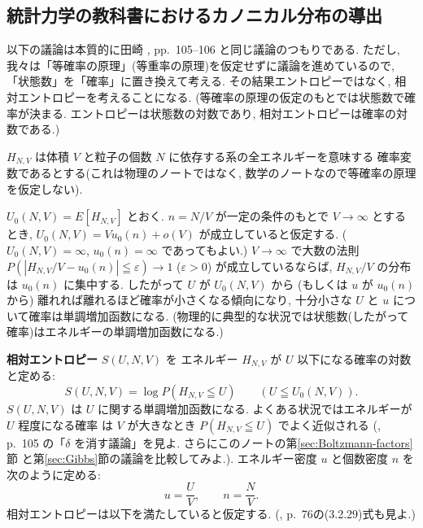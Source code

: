\documentclass[12pt,twoside]{jarticle}
\newcommand\eps{\varepsilon}
\theoremstyle{definition} %
\theoremstyle{definition} %
\theoremstyle{definition} %
\numberwithin{theorem}{section}
\numberwithin{equation}{section}
\numberwithin{figure}{section}
\numberwithin{table}{section}
\newcommand\secref[1]{第\ref{#1}節}
\begin{document}
\subsection{統計力学の教科書におけるカノニカル分布の導出}
\label{sec:canonical-distribution-in-physics}

以下の議論は本質的に田崎 \cite{Tasaki}, pp.~105--106 と同じ議論のつもりである.
ただし, 我々は「等確率の原理」(等重率の原理)を仮定せずに議論を進めているので, 
「状態数」を「確率」に置き換えて考える. 
その結果エントロピーではなく, 相対エントロピーを考えることになる.
(等確率の原理の仮定のもとでは状態数で確率が決まる.
エントロピーは状態数の対数であり, 相対エントロピーは確率の対数である.)

$H_{N,V}$ は体積 $V$ と粒子の個数 $N$ に依存する系の全エネルギーを意味する
確率変数であるとする(これは物理のノートではなく, 
数学のノートなので等確率の原理を仮定しない).

$U_0(N,V)=E[H_{N,V}]$ とおく.
$n=N/V$ が一定の条件のもとで $V\to\infty$ とするとき, 
$U_0(N,V)=V u_0(n)+o(V)$ が成立していると仮定する.
($U_0(N,V)=\infty$, $u_0(n)=\infty$ であってもよい.)
$V\to\infty$ で大数の法則 $P(|H_{N,V}/V-u_0(n)|\leqq\eps)\to 1$ ($\eps>0$)
が成立しているならば, $H_{N,V}/V$ の分布は $u_0(n)$ に集中する.
したがって $U$ が $U_0(N,V)$ から
(もしくは $u$ が $u_0(n)$ から)
離れれば離れるほど確率が小さくなる傾向になり, 
十分小さな $U$ と $u$ について確率は単調増加函数になる.
(物理的に典型的な状況では状態数(したがって確率)はエネルギーの単調増加函数になる.)

{\bf 相対エントロピー} $S(U,N,V)$ を
エネルギー $H_{N,V}$ が $U$ 以下になる確率の対数と定める:
\[
S(U,N,V) = \log P(H_{N,V}\leqq U)
\qquad (U\leqq U_0(N,V)).
\]
$S(U,N,V)$ は $U$ に関する単調増加函数になる.
よくある状況ではエネルギーが $U$ 程度になる確率
は $V$ が大きなとき $P(H_{N,V}\leqq U)$ でよく近似される
(\cite{Tasaki}, p.~105 の「$\delta$ を消す議論」を見よ.
さらにこのノートの\secref{sec:Boltzmann-factors}
と\secref{sec:Gibbs}の議論を比較してみよ.).
エネルギー密度 $u$ と個数密度 $n$ を次のように定める:
\[
u=\frac{U}{V}, \qquad n=\frac{N}{V}.
\]
相対エントロピーは以下を満たしていると仮定する.
(\cite{Tasaki}, p.~76の(3.2.29)式も見よ.)
\end{document}
